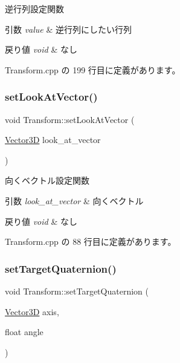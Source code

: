 逆行列設定関数 


\begin{DoxyParams}{引数}
{\em value} & 逆行列にしたい行列 \\
\hline
\end{DoxyParams}

\begin{DoxyRetVals}{戻り値}
{\em void} & なし \\
\hline
\end{DoxyRetVals}


 Transform.\+cpp の 199 行目に定義があります。

\mbox{\label{class_transform_a7a90095a66990f9e17b22c141dbe1379}} 
\subsubsection{\texorpdfstring{set\+Look\+At\+Vector()}{setLookAtVector()}}
{\footnotesize\ttfamily void Transform\+::set\+Look\+At\+Vector (\begin{DoxyParamCaption}\item[{\mbox{\hyperlink{class_vector3_d}{Vector3D}}}]{look\+\_\+at\+\_\+vector }\end{DoxyParamCaption})}



向くベクトル設定関数 


\begin{DoxyParams}{引数}
{\em look\+\_\+at\+\_\+vector} & 向くベクトル \\
\hline
\end{DoxyParams}

\begin{DoxyRetVals}{戻り値}
{\em void} & なし \\
\hline
\end{DoxyRetVals}


 Transform.\+cpp の 88 行目に定義があります。

\mbox{\label{class_transform_aa2d0352ed37603f7a80a8562ade5bcbe}} 
\subsubsection{\texorpdfstring{set\+Target\+Quaternion()}{setTargetQuaternion()}}
{\footnotesize\ttfamily void Transform\+::set\+Target\+Quaternion (\begin{DoxyParamCaption}\item[{\mbox{\hyperlink{class_vector3_d}{Vector3D}}}]{axis,  }\item[{float}]{angle }\end{DoxyParamCaption})}



